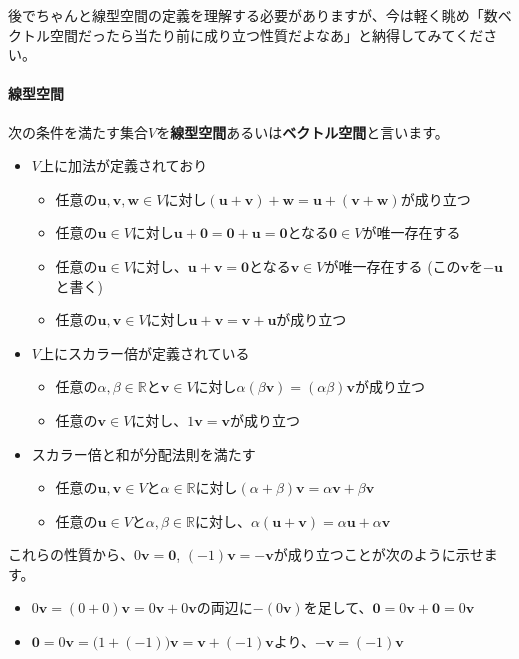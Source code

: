 後でちゃんと線型空間の定義を理解する必要がありますが、今は軽く眺め「数ベクトル空間だったら当たり前に成り立つ性質だよなあ」と納得してみてください。

\paragraph{線型空間}

次の条件を満たす集合$V$を\textbf{線型空間}あるいは\textbf{ベクトル空間}と言います。

\begin{itemize}
\item $V$上に加法が定義されており
\begin{itemize}
\item 任意の$\bm{u}, \bm{v}, \bm{w}\in V$に対し$(\bm{u} + \bm{v}) + \bm{w} = \bm{u} + (\bm{v} + \bm{w})$が成り立つ
\item 任意の$\bm{u}\in V$に対し$\bm{u} + \bm{0} = \bm{0} + \bm{u} = \bm{0}$となる$\bm{0}\in V$が唯一存在する
\item 任意の$\bm{u}\in V$に対し、$\bm{u} + \bm{v} = \bm{0}$となる$\bm{v}\in V$が唯一存在する (この$\bm{v}$を$-\bm{u}$と書く)
\item 任意の$\bm{u}, \bm{v}\in V$に対し$\bm{u} + \bm{v} = \bm{v} + \bm{u}$が成り立つ
\end{itemize}
\item $V$上にスカラー倍が定義されている
\begin{itemize}
\item 任意の$\alpha, \beta\in\mathbb{R}$と$\bm{v}\in V$に対し$\alpha(\beta\bm{v})=(\alpha\beta)\bm{v}$が成り立つ
\item 任意の$\bm{v}\in V$に対し、$1\bm{v}=\bm{v}$が成り立つ
\end{itemize}
\item スカラー倍と和が分配法則を満たす
\begin{itemize}
\item 任意の$\bm{u}, \bm{v}\in V$と$\alpha\in\mathbb{R}$に対し$(\alpha + \beta)\bm{v} = \alpha\bm{v} + \beta\bm{v}$
\item 任意の$\bm{u}\in V$と$\alpha,\beta\in\mathbb{R}$に対し、$\alpha(\bm{u} + \bm{v}) = \alpha\bm{u} + \alpha\bm{v}$
\end{itemize}
\end{itemize}

これらの性質から、$0\bm{v}=\bm{0}$, $(-1)\bm{v} = -\bm{v}$が成り立つことが次のように示せます。
\begin{itemize}
\item $0 \bm{v} = (0 + 0) \bm{v} = 0\bm{v} + 0\bm{v}$の両辺に$-(0\bm{v})$を足して、$\bm{0} = 0\bm{v} + \bm{0} = 0\bm{v}$
\item $\bm{0} = 0\bm{v} = \bigl(1 + (-1)\bigr)\bm{v} = \bm{v} + (-1) \bm{v}$より、$-\bm{v} = (-1)\bm{v}$
\end{itemize}

